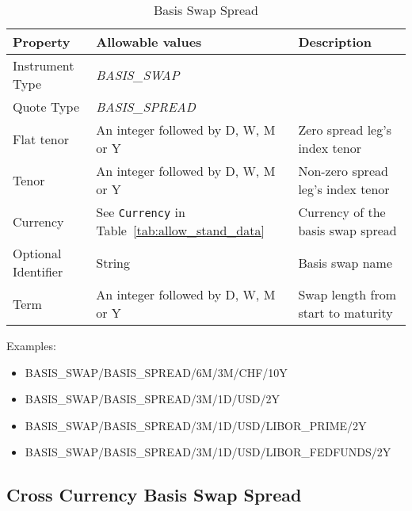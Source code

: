 \begin{table}[H]
\centering
  \begin{tabular}{|p{3.4cm}|p{3.8cm}|p{6.3cm}|}
    \hline
    {\bf Property} & {\bf Allowable values} & {\bf Description} \\ \hline
    Instrument Type & \emph{BASIS\_SWAP} & \\ \hline
    Quote Type & \emph{BASIS\_SPREAD} & \\ \hline
    Flat tenor & An integer followed by D, W, M or Y & Zero spread leg's index tenor\\ \hline
    Tenor & An integer followed by D, W, M or Y & Non-zero spread leg's index tenor\\ \hline
    Currency & See \lstinline!Currency! in Table~\ref{tab:allow_stand_data}& Currency of the basis swap spread\\ \hline
    Optional Identifier & String & Basis swap name\\ \hline
    Term & An integer followed by D, W, M or Y & Swap length from start to maturity\\ \hline
  \end{tabular}
  \caption{Basis Swap Spread}
  \label{tab:basisspread_quote}
\end{table}


\medskip
Examples:
\begin{itemize}
\item {BASIS\_SWAP/BASIS\_SPREAD/6M/3M/CHF/10Y}
\item {BASIS\_SWAP/BASIS\_SPREAD/3M/1D/USD/2Y}
\item {BASIS\_SWAP/BASIS\_SPREAD/3M/1D/USD/LIBOR\_PRIME/2Y}
\item {BASIS\_SWAP/BASIS\_SPREAD/3M/1D/USD/LIBOR\_FEDFUNDS/2Y}
\end{itemize}

\subsection{Cross Currency Basis Swap Spread}

